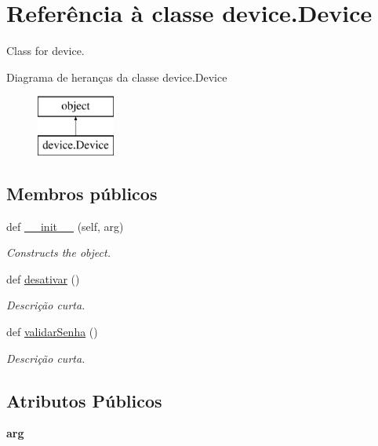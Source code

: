 \hypertarget{classdevice_1_1_device}{}\section{Referência à classe device.\+Device}
\label{classdevice_1_1_device}


Class for device.  


Diagrama de heranças da classe device.\+Device\begin{figure}[H]
\begin{center}
\leavevmode
\includegraphics[height=2.000000cm]{classdevice_1_1_device}
\end{center}
\end{figure}
\subsection*{Membros públicos}
\begin{DoxyCompactItemize}
\item 
def \hyperlink{classdevice_1_1_device_a6ed267a3bacc28a17a6dc910167b1ca2}{\+\_\+\+\_\+init\+\_\+\+\_\+} (self, arg)
\begin{DoxyCompactList}\small\item\em Constructs the object. \end{DoxyCompactList}\item 
def \hyperlink{classdevice_1_1_device_a46b3c76c75ad8a9d553f751a2086f7d6}{desativar} ()
\begin{DoxyCompactList}\small\item\em Descrição curta. \end{DoxyCompactList}\item 
def \hyperlink{classdevice_1_1_device_afe65617fbdfe35b5ec90b33e36a0a0d3}{validar\+Senha} ()
\begin{DoxyCompactList}\small\item\em Descrição curta. \end{DoxyCompactList}\end{DoxyCompactItemize}
\subsection*{Atributos Públicos}
\begin{DoxyCompactItemize}
\item 
{\bfseries arg}\hypertarget{classdevice_1_1_device_a0dca5f5fca68b9e9c63e238fbc21c84d}{}\label{classdevice_1_1_device_a0dca5f5fca68b9e9c63e238fbc21c84d}

\end{DoxyCompactItemize}


